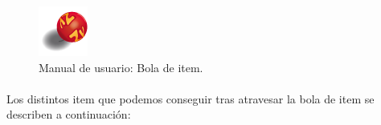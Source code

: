 \begin{figure}[H]
  \label{caja_item}
  \begin{center}
    \includegraphics[scale=1]{imagenes/items/item_box.png}
  \end{center}
 \caption{Manual de usuario: Bola de item.}
\end{figure}

\paragraph{}
Los distintos item que podemos conseguir tras atravesar la bola de item se describen a continuación:

